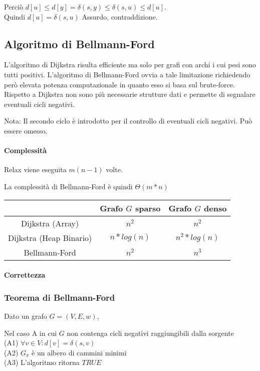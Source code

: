 Perciò $d[u] \leq d[y] = \delta(s,y) \leq \delta(s,u) \leq d[u]$. \\ Quindi $d[u]= \delta(s,u)$ Assurdo, contraddizione.


\subsection{Algoritmo di Bellmann-Ford}

{L'algoritmo di Dijkstra risulta efficiente ma solo per grafi con archi i cui pesi sono tutti positivi. L'algoritmo di Bellmann-Ford ovvia a tale limitazione richiedendo però elevata potenza computazionale in quanto esso si basa sul brute-force. Rispetto a Dijkstra non sono più necessarie strutture dati e permette di segnalare eventuali cicli negativi.}



Nota: Il secondo ciclo è introdotto per il controllo di eventuali cicli negativi. Può essere omesso.

\paragraph{Complessità}

Relax viene eseguita $m(n-1)$ volte.

La complessità di Bellmann-Ford è quindi $\Theta(m*n)$

\begin{tabular}{|c|c|c|}
\hline
  & Grafo $G$ sparso & Grafo $G$ denso \\
\hline
Dijkstra (Array) & $n^2$ & $n^2$ \\
\hline
Dijkstra (Heap Binario) & $n*log(n)$ & $n^2*log(n)$ \\
\hline
Bellmann-Ford & $n^2$ & $n^3$ \\
\hline
\end{tabular}

\paragraph{Correttezza}

\subsubsection{Teorema di Bellmann-Ford}

Dato un grafo $G=(V,E,w)$,

Nel caso A in cui $G$ non contenga cicli negativi raggiungibili dalla sorgente\\
(A1) $\forall v \in V : d[v] = \delta(s,v)$ \\
(A2) $G_\pi$ è un albero di cammini minimi\\
(A3) L'algoritmo ritorna $TRUE$


